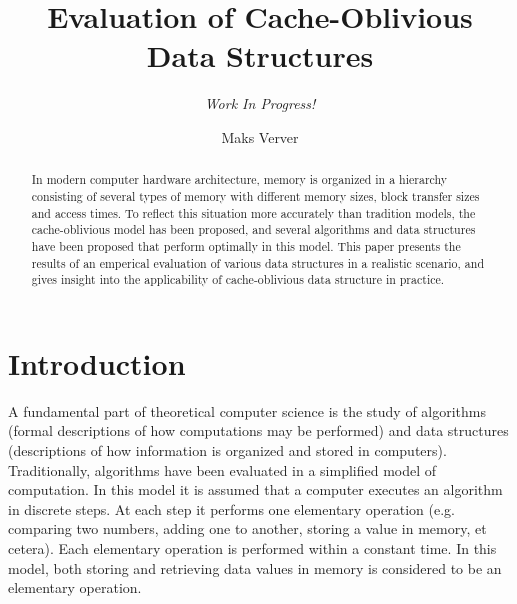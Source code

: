 \documentclass{acm_proc_article-sp}
\begin{document}
\title{Evaluation of Cache-Oblivious Data Structures}
\subtitle{\textit{Work In Progress!}}

\author{Maks Verver\\ }


\maketitle

\begin{abstract}
In modern computer hardware architecture, memory is organized in a hierarchy
consisting of several types of memory with different memory sizes, block
transfer sizes and access times. To reflect this situation more accurately
than tradition models, the cache-oblivious model has been proposed, and several
algorithms and data structures have been proposed that perform optimally in
this model.
This paper presents the results of an emperical evaluation of various data
structures in a realistic scenario, and gives insight into the applicability
of cache-oblivious data structure in practice.
\end{abstract}



\section{Introduction}
A fundamental part of theoretical computer science is the study of algorithms (formal descriptions of how computations may be performed) and data structures (descriptions of how information is organized and stored in computers). Traditionally, algorithms have been evaluated in a simplified model of computation. In this model it is assumed that a computer executes an algorithm in discrete steps. At each step it performs one elementary operation (e.g. comparing two numbers, adding one to another, storing a value in memory, et cetera). Each elementary operation is performed within a constant time. In this model, both storing and retrieving data values in memory is considered to be an elementary operation.
\end{document}
